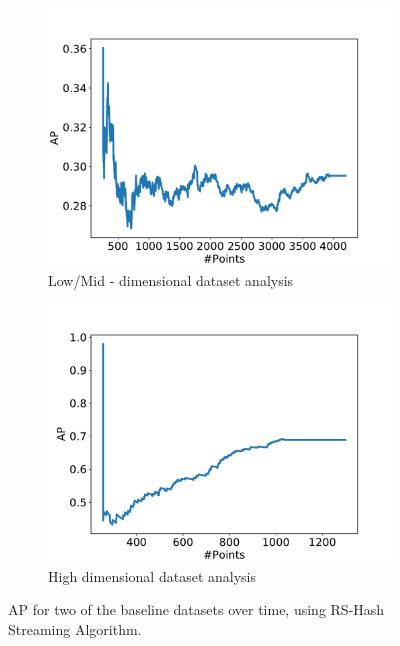 \begin{figure}[ht!]
    \centering
    \begin{subfigure}[t]{0.48\textwidth}
        \centering
        \includegraphics[width=\linewidth]{fig/streaming_baseline/letter-recognition.pdf}
        \caption{Low/Mid - dimensional dataset analysis}
    \end{subfigure}
    \hfill
    \begin{subfigure}[t]{0.48\textwidth}
        \centering
        \includegraphics[width=\linewidth]{fig/streaming_baseline/madelon.pdf}
        \caption{High dimensional dataset analysis}
    \end{subfigure}
		\hfill
    \caption{AP for two of the baseline datasets over time, using RS-Hash Streaming Algorithm.}
\end{figure}

